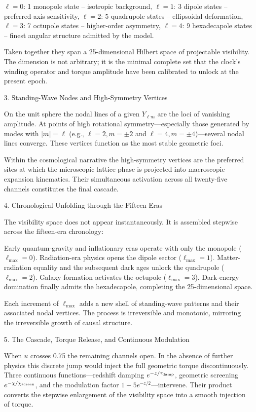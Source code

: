 \(\ell=0\): 1 monopole state – isotropic background,
\(\ell=1\): 3 dipole states – preferred-axis sensitivity,
\(\ell=2\): 5 quadrupole states – ellipsoidal deformation,
\(\ell=3\): 7 octupole states – higher-order asymmetry,
\(\ell=4\): 9 hexadecapole states – finest angular structure admitted by the model.

Taken together they span a 25-dimensional Hilbert space of projectable visibility. The dimension is not arbitrary; it is the minimal complete set that the clock’s winding operator and torque amplitude have been calibrated to unlock at the present epoch.

3. Standing-Wave Nodes and High-Symmetry Vertices

On the unit sphere the nodal lines of a given \(Y_{\ell m}\) are the loci of vanishing amplitude. At points of high rotational symmetry—especially those generated by modes with \(|m|=\ell\) (e.g., \(\ell=2,m=\pm2\) and \(\ell=4,m=\pm4\))—several nodal lines converge. These vertices function as the most stable geometric foci.

Within the cosmological narrative the high-symmetry vertices are the preferred sites at which the microscopic lattice phase is projected into macroscopic expansion kinematics. Their simultaneous activation across all twenty-five channels constitutes the final cascade.

4. Chronological Unfolding through the Fifteen Eras

The visibility space does not appear instantaneously. It is assembled stepwise across the fifteen-era chronology:

Early quantum-gravity and inflationary eras operate with only the monopole (\(\ell_{\max}=0\)).
Radiation-era physics opens the dipole sector (\(\ell_{\max}=1\)).
Matter-radiation equality and the subsequent dark ages unlock the quadrupole (\(\ell_{\max}=2\)).
Galaxy formation activates the octupole (\(\ell_{\max}=3\)).
Dark-energy domination finally admits the hexadecapole, completing the 25-dimensional space.

Each increment of \(\ell_{\max}\) adds a new shell of standing-wave patterns and their associated nodal vertices. The process is irreversible and monotonic, mirroring the irreversible growth of causal structure.

5. The Cascade, Torque Release, and Continuous Modulation

When \(u\) crosses 0.75 the remaining channels open. In the absence of further physics this discrete jump would inject the full geometric torque discontinuously. Three continuous functions—redshift damping \(e^{-z/\tau_{\rm damp}}\), geometric screening \(e^{-\chi/\chi_{\rm screen}}\), and the modulation factor \(1+5e^{-z/2}\)—intervene. Their product converts the stepwise enlargement of the visibility space into a smooth injection of torque.

